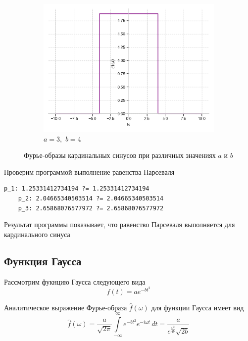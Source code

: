\documentclass[a4paper, 16pt]{article}
\begin{document}
\begin{figure}[htbp]
\begin{subfigure}{0.3\textwidth}
            \centering
            \includegraphics[width=\linewidth]{sincfimg_a=3_b=4.png}
            \caption{$a=3,\,\,b=4$}
            \label{fig:sincfimg_3}
        \end{subfigure}
        \caption{Фурье-образы кардинальных синусов при различных значениях $a$ и $b$}
        \label{fig:sincfimgs}
    \end{figure}




    \noindent Проверим программой выполнение равенства Парсеваля
    \begin{lstlisting}[label=pars_sinc, caption=Равенство Парсеваля для кардинальных синусов]
    p_1: 1.25331412734194 ?= 1.25331412734194
    p_2: 2.04665340503514 ?= 2.04665340503514
    p_3: 2.65868076577972 ?= 2.65868076577972
    \end{lstlisting}


    \noindent Результат программы показывает, что равенство Парсеваля выполняется для кардинального синуса


    \subsection{Функция Гаусса}
    \noindent Рассмотрим фукнцию Гаусса следующего вида
    $$
    f(t)=ae^{-bt^2}
    $$


    \noindent Аналитическое выражение Фурье-образа $\hat{f}(\omega)$ для функции Гаусса
    имеет вид
    $$
    \hat{f}(\omega)=\dfrac{a}{\sqrt{2\pi}}\int\limits_{-\infty}^{\infty}e^{-bt^2}e^{-i\omega t}\,dt=\dfrac{a}{e^{\frac{\omega^2}{4b}}\sqrt{2b}}
    $$
\end{document}
